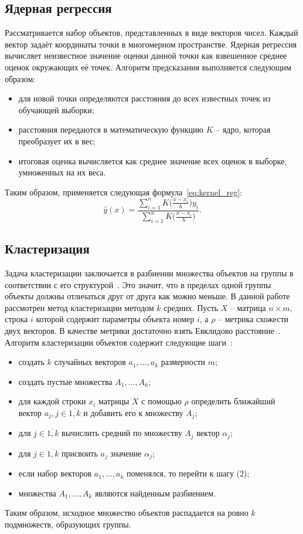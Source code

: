 \subsection{Ядерная регрессия}
Рассматривается набор объектов, представленных в виде векторов чисел.
Каждый вектор задаёт координаты точки в многомерном пространстве.
Ядерная регрессия вычисляет неизвестное значение оценки данной точки как взвешенное среднее оценок окружающих её точек.
Алгоритм предсказания выполняется следующим образом:
\begin{itemize}
	\item для новой точки определяются расстояния до всех известных точек  из обучающей выборки;
	\item расстояния передаются в математическую функцию $K$ -- ядро, которая преобразует их в вес;
	\item итоговая оценка вычисляется как среднее значение всех оценок в выборке, умноженных на их веса.
\end{itemize}
Таким образом, применяется следующая формула~\eqref{eq:kernel_reg}:
\begin{equation}
\label{eq:kernel_reg}
	\hat{y}(x) = \frac{\sum\limits_{i=1}^{n} K \Big( \frac{x-x_{i}}{h} \Big) y_{i}}{\sum\limits_{i=1}^{n} K \Big( \frac{x-x_{i}}{h} \Big)}.
\end{equation}

\subsection{Кластеризация}
Задача кластеризации заключается в разбиении множества объектов на группы в соответствии с его структурой~\cite{segaran}.
Это значит, что в пределах одной группы объекты должны отличаться друг от друга как можно меньше.
В данной работе рассмотрен метод кластеризации методом $k$ средних.
Пусть $X$ -- матрица $n \times m$, строка $i$ которой содержит параметры объекта номер $i$, а $\rho$ -- метрика схожести двух векторов.
В качестве метрики достаточно взять Евклидово расстояние~\cite{segaran}.
Алгоритм кластеризации объектов содержит следующие шаги~\cite{segaran}:
\begin{itemize}
    \item создать $k$ случайных векторов $a_1,\dots,a_k$ размерности $m$;
    \item создать пустые множества $A_1,\dots,A_k$;
    \item для каждой строки $x_i$ матрицы $X$ с помощью $\rho$ определить ближайший вектор $a_j, j \in \overline{1,k}$ и добавить его к множеству $A_j$;
    \item для $j \in \overline{1,k}$ вычислить средний по множеству $A_j$ вектор $\alpha_j$;
    \item для $j \in \overline{1,k}$ присвоить $a_j$ значение $\alpha_j$;
    \item если набор векторов $a_1,\dots,a_k$ поменялся, то перейти к шагу (2);
    \item множества $A_1,\dots,A_k$ являются найденным разбиением.
\end{itemize}
Таким образом, исходное множество объектов распадается на ровно $k$ подмножеств, образующих группы.

